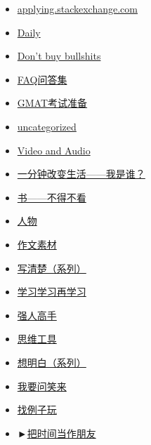 \begin{itemize}[<+->]
  \begin{itemize}[<+->]
  \item
    \href{/web/20131011170823/http://wordpress.lixiaolai.com/archives/category/applying-stackexchange-com}{applying.stackexchange.com}
  \item
    \href{/web/20131011170823/http://wordpress.lixiaolai.com/archives/category/daily}{Daily}
  \item
    \href{/web/20131011170823/http://wordpress.lixiaolai.com/archives/category/dont-buy-bullshits}{Don't
    buy bullshits}
  \item
    \href{/web/20131011170823/http://wordpress.lixiaolai.com/archives/category/faq-sets}{FAQ问答集}
  \item
    \href{/web/20131011170823/http://wordpress.lixiaolai.com/archives/category/gmat-prep}{GMAT考试准备}
  \item
    \href{/web/20131011170823/http://wordpress.lixiaolai.com/archives/category/uncategorized}{uncategorized}
  \item
    \href{/web/20131011170823/http://wordpress.lixiaolai.com/archives/category/video-and-audio}{Video
    and Audio}
  \item
    \href{/web/20131011170823/http://wordpress.lixiaolai.com/archives/category/\%e4\%b8\%80\%e5\%88\%86\%e9\%92\%9f\%e6\%94\%b9\%e5\%8f\%98\%e7\%94\%9f\%e6\%b4\%bb-\%e6\%88\%91\%e6\%98\%af\%e8\%b0\%81\%ef\%bc\%9f-in-chinese}{一分钟改变生活------我是谁？}
  \item
    \href{/web/20131011170823/http://wordpress.lixiaolai.com/archives/category/books-that-should-not-be-missed}{书------不得不看}
  \item
    \href{/web/20131011170823/http://wordpress.lixiaolai.com/archives/category/people}{人物}
  \item
    \href{/web/20131011170823/http://wordpress.lixiaolai.com/archives/category/readings-for-writing}{作文素材}
  \item
    \href{/web/20131011170823/http://wordpress.lixiaolai.com/archives/category/clear-writing}{写清楚（系列）}
  \item
    \href{/web/20131011170823/http://wordpress.lixiaolai.com/archives/category/learning-learning-to-learn-better}{学习学习再学习}
  \item
    \href{/web/20131011170823/http://wordpress.lixiaolai.com/archives/category/versatile}{强人高手}
  \item
    \href{/web/20131011170823/http://wordpress.lixiaolai.com/archives/category/thinking-tools}{思维工具}
  \item
    \href{/web/20131011170823/http://wordpress.lixiaolai.com/archives/category/thinking-clearly-series}{想明白（系列）}
  \item
    \href{/web/20131011170823/http://wordpress.lixiaolai.com/archives/category/response-to-readers}{我要问笑来}
  \item
    \href{/web/20131011170823/http://wordpress.lixiaolai.com/archives/category/finding-examples}{找例子玩}
  \item
    ►\href{/web/20131011170823/http://wordpress.lixiaolai.com/archives/category/time-as-a-friend}{把时间当作朋友}


\end{itemize}
\end{itemize}
